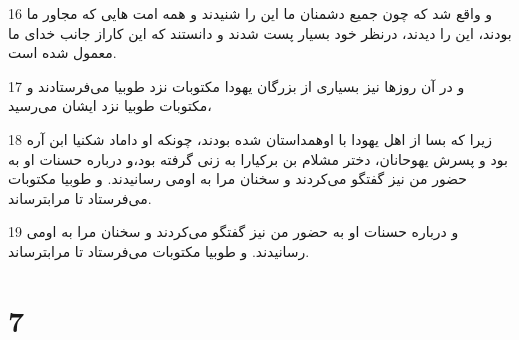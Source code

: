 \par 16 و واقع شد که چون جمیع دشمنان ما این را شنیدند و همه امت هایی که مجاور ما بودند، این را دیدند، درنظر خود بسیار پست شدند و دانستند که این کاراز جانب خدای ما معمول شده است.
\par 17 و در آن روزها نیز بسیاری از بزرگان یهودا مکتوبات نزد طوبیا می‌فرستادند و مکتوبات طوبیا نزد ایشان می‌رسید،
\par 18 زیرا که بسا از اهل یهودا با اوهمداستان شده بودند، چونکه او داماد شکنیا ابن آره بود و پسرش یهوحانان، دختر مشلام بن برکیارا به زنی گرفته بود،و درباره حسنات او به حضور من نیز گفتگو می‌کردند و سخنان مرا به اومی رسانیدند. و طوبیا مکتوبات می‌فرستاد تا مرابترساند.
\par 19 و درباره حسنات او به حضور من نیز گفتگو می‌کردند و سخنان مرا به اومی رسانیدند. و طوبیا مکتوبات می‌فرستاد تا مرابترساند.
 
\chapter{7}

